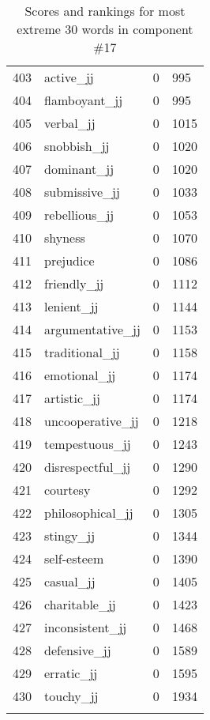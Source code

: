 \begin{longtable}[!htbp]{| rlr@{.}l |}
    403 & active\_jj & 0 & 995 \\
    404 & flamboyant\_jj & 0 & 995 \\
    405 & verbal\_jj & 0 & 1015 \\
    406 & snobbish\_jj & 0 & 1020 \\
    407 & dominant\_jj & 0 & 1020 \\
    408 & submissive\_jj & 0 & 1033 \\
    409 & rebellious\_jj & 0 & 1053 \\
    410 & shyness & 0 & 1070 \\
    411 & prejudice & 0 & 1086 \\
    412 & friendly\_jj & 0 & 1112 \\
    413 & lenient\_jj & 0 & 1144 \\
    414 & argumentative\_jj & 0 & 1153 \\
    415 & traditional\_jj & 0 & 1158 \\
    416 & emotional\_jj & 0 & 1174 \\
    417 & artistic\_jj & 0 & 1174 \\
    418 & uncooperative\_jj & 0 & 1218 \\
    419 & tempestuous\_jj & 0 & 1243 \\
    420 & disrespectful\_jj & 0 & 1290 \\
    421 & courtesy & 0 & 1292 \\
    422 & philosophical\_jj & 0 & 1305 \\
    423 & stingy\_jj & 0 & 1344 \\
    424 & self-esteem & 0 & 1390 \\
    425 & casual\_jj & 0 & 1405 \\
    426 & charitable\_jj & 0 & 1423 \\
    427 & inconsistent\_jj & 0 & 1468 \\
    428 & defensive\_jj & 0 & 1589 \\
    429 & erratic\_jj & 0 & 1595 \\
    430 & touchy\_jj & 0 & 1934 \\
    \hline
    \caption{Scores and rankings for most extreme 30 words in component \#17} \\
\end{longtable}
